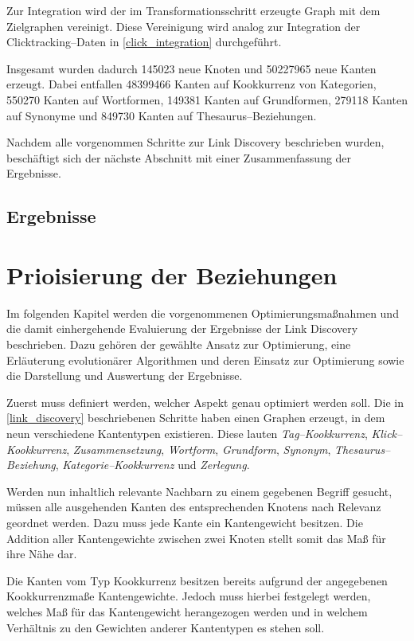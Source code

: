 Zur Integration wird der im Transformationsschritt erzeugte Graph mit dem Zielgraphen vereinigt. Diese Vereinigung wird analog zur Integration der Clicktracking--Daten in \cref{click_integration} durchgeführt.

Insgesamt wurden dadurch \num{145023} neue Knoten und \num{50227965} neue Kanten erzeugt.  Dabei entfallen \num{48399466} Kanten auf Kookkurrenz von Kategorien, \num{550270} Kanten auf Wortformen, \num{149381} Kanten auf Grundformen, \num{279118} Kanten auf Synonyme und \num{849730} Kanten auf Thesaurus--Beziehungen.

Nachdem alle vorgenommen Schritte zur Link Discovery beschrieben wurden, beschäftigt sich der nächste Abschnitt mit einer Zusammenfassung der Ergebnisse.

\subsection{Ergebnisse}

\section{Prioisierung der Beziehungen}

Im folgenden Kapitel werden die vorgenommenen Optimierungsmaßnahmen und die damit einhergehende Evaluierung der Ergebnisse der Link Discovery beschrieben. Dazu gehören der gewählte Ansatz zur Optimierung, eine Erläuterung evolutionärer Algorithmen und deren Einsatz zur Optimierung sowie die Darstellung und Auswertung der Ergebnisse.

Zuerst muss definiert werden, welcher Aspekt genau optimiert werden soll. Die in \cref{link_discovery} beschriebenen Schritte haben einen Graphen erzeugt, in dem neun verschiedene Kantentypen existieren. Diese lauten \emph{Tag--Kookkurrenz}, \emph{Klick--Kookkurrenz}, \emph{Zusammensetzung}, \emph{Wortform}, \emph{Grundform}, \emph{Synonym}, \emph{Thesaurus--Beziehung}, \emph{Kategorie--Kookkurrenz} und \emph{Zerlegung}.

Werden nun inhaltlich relevante Nachbarn zu einem gegebenen Begriff gesucht, müssen alle ausgehenden Kanten des entsprechenden Knotens nach Relevanz geordnet werden. Dazu muss jede Kante ein Kantengewicht besitzen. Die Addition aller Kantengewichte zwischen zwei Knoten stellt somit das Maß für ihre Nähe dar.

Die Kanten vom Typ Kookkurrenz besitzen bereits aufgrund der angegebenen Kookkurrenzmaße Kantengewichte. Jedoch muss hierbei festgelegt werden, welches Maß für das Kantengewicht herangezogen werden und in welchem Verhältnis zu den Gewichten anderer Kantentypen es stehen soll.

